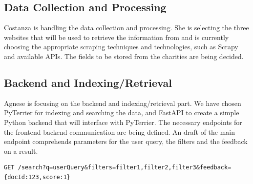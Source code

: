 \documentclass[unicode,9pt,a4paper,oneside,numbers=endperiod,openany]{scrartcl}
\begin{document}
\subsection{Data Collection and Processing}
Costanza is handling the data collection and processing. She is selecting the three websites that will be used to retrieve the information from and is currently choosing the appropriate scraping techniques and technologies, such as Scrapy and available APIs. The fields to be stored from the charities are being decided.

\subsection{Backend and Indexing/Retrieval}
Agnese is focusing on the backend and indexing/retrieval part.
We have chosen PyTerrier for indexing and searching the data, and FastAPI to create a simple Python backend that will interface with PyTerrier.
The necessary endpoints for the frontend-backend communication are being defined.
An draft of the main endpoint comprehends parameters for the user query, the filters and the feedback on a result.
\begin{verbatim}
GET /search?q=userQuery&filters=filter1,filter2,filter3&feedback={docId:123,score:1}
\end{verbatim}
\end{document}
